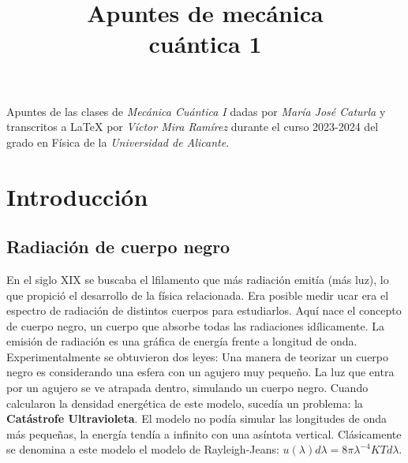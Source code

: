 \documentclass{report}
\title{\Huge{Apuntes de mecánica\\ cuántica 1}}
\author{}
\date{\number\year}
\begin{document}
\maketitle
\clearpage
\noindent Apuntes de las clases de \textit{Mecánica Cuántica I} dadas por \textit{María José Caturla} y transcritos a \LaTeX
\hspace{0cm} por \textit{Víctor Mira Ramírez} durante el curso 2023-2024 del grado en Física de la \textit{Universidad de Alicante}.
\pagebreak
\tableofcontents
\pagebreak

\chapter{Introducción}
  \vspace{-0.8cm}
  \section{Radiación de cuerpo negro}
    \noindent En el siglo XIX se buscaba el lfilamento que más radiación emitía (más luz), lo que propició el desarrollo de la física relacionada.
    Era posible medir ucar era el espectro de radiación de distintos cuerpos para estudiarlos. Aquí nace el concepto de cuerpo negro, un cuerpo
    que absorbe todas las radiaciones idílicamente. La emisión de radiación es una gráfica de energía frente a longitud de onda. 
    Experimentalmente se obtuvieron dos leyes:
    \noindent Una manera de teorizar un cuerpo negro es considerando una esfera con un agujero muy pequeño. La luz que entra por un agujero se ve atrapada dentro,
    simulando un cuerpo negro. Cuando calcularon la densidad energética de este modelo, sucedía un problema: la \textbf{Catástrofe Ultravioleta}. El modelo no podía
    simular las longitudes de onda más pequeñas, la energía tendía a infinito con una asíntota vertical. Clásicamente se denomina a este modelo el modelo de 
    Rayleigh-Jeans: $u(\lambda)d\lambda=8\pi\lambda^{-4}KTd\lambda$. 
\end{document}
